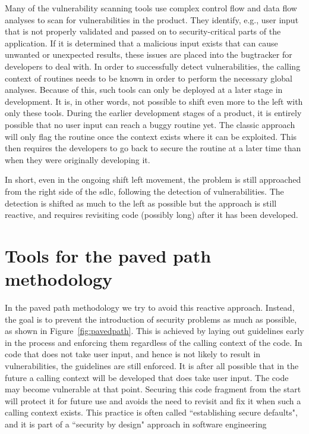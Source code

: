 Many of the vulnerability scanning tools use complex control flow and data flow analyses to scan for vulnerabilities in the product. They identify, e.g., user input that is not properly validated and passed on to security-critical parts of the application. If it is determined that a malicious input exists that can cause unwanted or unexpected results, these issues are placed into the \gls{bugtracker} for developers to deal with. In order to successfully detect vulnerabilities, the calling context of routines needs to be known in order to perform the necessary global analyses. Because of this, such tools can only be deployed at a later stage in development. It is, in other words, not possible to shift even more to the left with only these tools. During the earlier development stages of a product, it is entirely possible that no user input can reach a buggy routine yet. The classic approach will only flag the routine once the context exists where it can be exploited. This then requires the developers to go back to secure the routine at a later time than when they were originally developing it. 

In short, even in the ongoing shift left movement, the problem is still approached from the right side of the \gls{sdlc}, following the detection of vulnerabilities. The detection is shifted as much to the left as possible but the approach is still reactive, and requires revisiting code (possibly long) after it has been developed. 

\section{Tools for the paved path methodology}
In the paved path methodology we try to avoid this reactive approach.
Instead, the goal is to prevent the introduction of \glspl{security problem} as much as possible, as shown in Figure~\ref{fig:pavedpath}.
This is achieved by laying out guidelines early in the process and enforcing them regardless of the calling context of the code. 
In code that does not take user input, and hence is not likely to result in vulnerabilities, the guidelines are still enforced.
It is after all possible that in the future a calling context will be developed that does take user input.
The code may become vulnerable at that point.
Securing this code fragment from the start will protect it for future use and avoids the need to revisit and fix it when such a calling context exists.
This practice is often called ``establishing secure defaults", and it is part of a ``security by design" approach in software engineering


